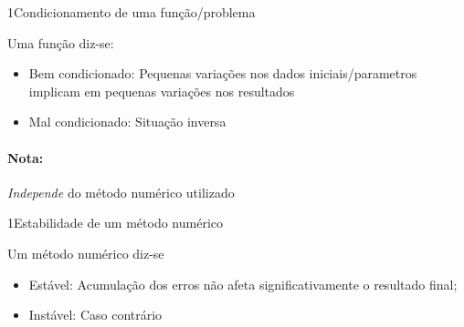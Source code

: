 \documentclass[./CN_A-Slides_Anotacoes.tex]{subfiles}
\begin{document}
\begin{sectionBox}1{Condicionamento de uma função/problema} %

  Uma função diz-se:
  \begin{itemize}
    \item \textcolor{green\Light}{Bem condicionado:} Pequenas variações nos dados iniciais/parametros implicam em pequenas variações nos resultados
    \item \textcolor{red\Light}{Mal condicionado:} Situação inversa
  \end{itemize}
  \paragraph{Nota:} \emph{Independe} do método numérico utilizado

\end{sectionBox}

\begin{sectionBox}1{Estabilidade de um método numérico} %

  Um método numérico diz-se
  \begin{itemize}
    \item \textcolor{green\Light}{Estável:} Acumulação dos erros não afeta significativamente o resultado final;
    \item \textcolor{red\Light}{Instável: } Caso contrário
  \end{itemize}

\end{sectionBox}
\end{document}
